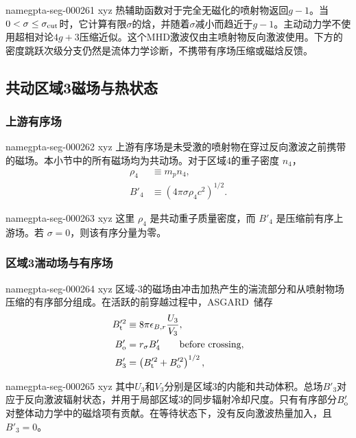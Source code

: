 \documentclass[twocolumn]{aastex702}
\makeatletter
\newcommand{\asgard}{\textsc{ASGARD}}
\providecommand{\gptareaderanchor}[1]{\pdfdest name{#1} xyz}%
\providecommand{\gptareaderanchor}[1]{\special{pdf:dest (#1) [ @thispage /XYZ @xpos @ypos null ]}}%
\makeatother
\begin{document}
\gptareaderanchor{gpta-seg-000261}%
热辅助函数对于完全无磁化的喷射物返回\(g-1\)。当\(0<\sigma\le\sigma_{\rm cut}\)时，它计算有限\(\sigma\)的焓，并随着\(\sigma\)减小而趋近于\(g-1\)。主动动力学不使用超相对论\(4g+3\)压缩近似。这个MHD激波仅由主喷射物反向激波使用。下方的密度跳跃次级分支仍然是流体力学诊断，不携带有序场压缩或磁焓反馈。

\subsection{共动区域3磁场与热状态}

\subsubsection{上游有序场}


\gptareaderanchor{gpta-seg-000262}%
上游有序场是未受激的喷射物在穿过反向激波之前携带的磁场。本小节中的所有磁场均为共动场。对于区域4的重子密度 \(n_4\)，
\begin{equation}
\begin{aligned}
\rho_4&\equiv m_pn_4,\\
B'_4&\equiv (4\pi\sigma\rho_4c^2)^{1/2}.
\end{aligned}
\end{equation}

\gptareaderanchor{gpta-seg-000263}%
这里 \(\rho_4\) 是共动重子质量密度，而 \(B'_4\) 是压缩前有序上游场。若 \(\sigma=0\)，则该有序分量为零。

\subsubsection{区域3湍动场与有序场}


\gptareaderanchor{gpta-seg-000264}%
区域-3的磁场由冲击加热产生的湍流部分和从喷射物场压缩的有序部分组成。在活跃的前穿越过程中，\asgard\ 储存
\begin{equation}
\begin{aligned}
B_{\rm t}^{\prime 2}&\equiv 8\pi\epsilon_{B,r}\frac{U_3}{V_3},\\
B'_{\rm o}&=r_\sigma B'_4 \qquad \hbox{before crossing},\\
B'_3&=\left(B_{\rm t}^{\prime 2}+B_{\rm o}^{\prime 2}\right)^{1/2},
\end{aligned}
\end{equation}

\gptareaderanchor{gpta-seg-000265}%
其中\(U_3\)和\(V_3\)分别是区域3的内能和共动体积。总场\(B'_3\)对应于反向激波辐射状态，并用于局部区域3的同步辐射冷却尺度。只有有序部分\(B'_{\rm o}\)对整体动力学中的磁焓项有贡献。在等待状态下，没有反向激波热量加入，且\(B'_3=0\)。
\end{document}
